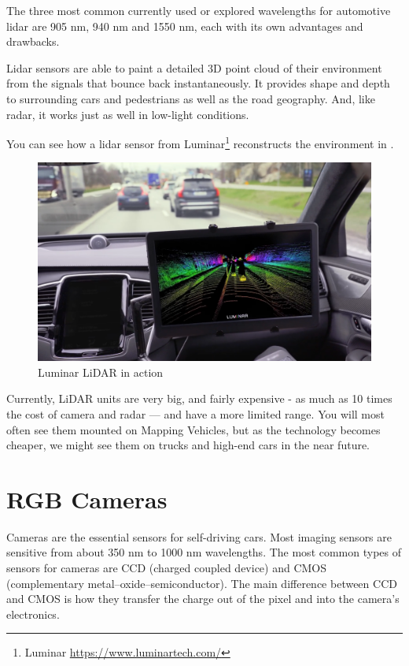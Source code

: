 The three most common currently used or explored wavelengths for automotive
lidar are 905 nm, 940 nm and 1550 nm, each with its own advantages and
drawbacks.

Lidar sensors are able to paint a detailed 3D point cloud of their environment
from the signals that bounce back instantaneously. It provides shape and depth
to surrounding cars and pedestrians as well as the road geography. And, like
radar, it works just as well in low-light conditions.

You can see how a lidar sensor from Luminar\footnote{Luminar
\url{https://www.luminartech.com/}} reconstructs the environment in
.

\begin{figure}[!ht]
    \centering
    \includegraphics[width=150mm, keepaspectratio]{figures/luminar.png}
    \caption{Luminar LiDAR in action}
    \label{fig:luminar}
\end{figure}


Currently, LiDAR units are very big, and fairly expensive - as much as 10 times
the cost of camera and radar — and have a more limited range. You will most
often see them mounted on Mapping Vehicles, but as the technology becomes
cheaper, we might see them on trucks and high-end cars in the near future.

\section{RGB Cameras}

Cameras are the essential sensors for self-driving cars. Most imaging sensors
are sensitive from about 350 nm to 1000 nm wavelengths. The most common types of
sensors for cameras are CCD (charged coupled device) and CMOS (complementary
metal–oxide–semiconductor). The main difference between CCD and CMOS is how they
transfer the charge out of the pixel and into the camera’s electronics.

